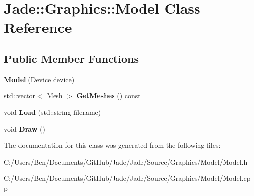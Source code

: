 \hypertarget{class_jade_1_1_graphics_1_1_model}{}\section{Jade\+:\+:Graphics\+:\+:Model Class Reference}
\label{class_jade_1_1_graphics_1_1_model}
\subsection*{Public Member Functions}
\begin{DoxyCompactItemize}
\item 
\hypertarget{class_jade_1_1_graphics_1_1_model_af0c53a6b45d446cf763f8a074c384b59}{}{\bfseries Model} (\hyperlink{class_jade_1_1_graphics_1_1_device}{Device} device)\label{class_jade_1_1_graphics_1_1_model_af0c53a6b45d446cf763f8a074c384b59}

\item 
\hypertarget{class_jade_1_1_graphics_1_1_model_a0d85e89daa0e6f60bc16db7dbf045ce2}{}std\+::vector$<$ \hyperlink{class_jade_1_1_graphics_1_1_mesh}{Mesh} $>$ {\bfseries Get\+Meshes} () const \label{class_jade_1_1_graphics_1_1_model_a0d85e89daa0e6f60bc16db7dbf045ce2}

\item 
\hypertarget{class_jade_1_1_graphics_1_1_model_af810f04f7191f97267b43c42a9dbb1f6}{}void {\bfseries Load} (std\+::string filename)\label{class_jade_1_1_graphics_1_1_model_af810f04f7191f97267b43c42a9dbb1f6}

\item 
\hypertarget{class_jade_1_1_graphics_1_1_model_a1029b2a86cb0e2c075d30cba6df224ea}{}void {\bfseries Draw} ()\label{class_jade_1_1_graphics_1_1_model_a1029b2a86cb0e2c075d30cba6df224ea}

\end{DoxyCompactItemize}


The documentation for this class was generated from the following files\+:\begin{DoxyCompactItemize}
\item 
C\+:/\+Users/\+Ben/\+Documents/\+Git\+Hub/\+Jade/\+Jade/\+Source/\+Graphics/\+Model/Model.\+h\item 
C\+:/\+Users/\+Ben/\+Documents/\+Git\+Hub/\+Jade/\+Jade/\+Source/\+Graphics/\+Model/Model.\+cpp\end{DoxyCompactItemize}
